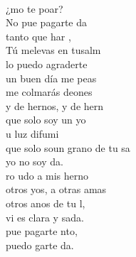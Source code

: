 \documentclass[12pt]{article}
\begin{document}
\begin{multicols*}{2}
\begin{cancion}%
	    \\
	¿mo te poar?  \\
	No pue pagarte da   \\
	 tanto que har , \\
	Tú melevas en tusalm  \\
\jump
	lo puedo agraderte\\
	un buen día me peas\\
	me colmarás deones\\
	y de hernos, y de hern  \\
\jump
	 que solo soy un yo  \\
	u luz difumi\\
	 que solo soun grano de tu sa \\
	yo no soy da.\\
	ro udo a mis herno\\
	otros yos, a otras amas\\
	otros anos de tu l,\\
	 vi es clara y sada. \\
	 pue pagarte nto,\\
	 puedo garte da.\\
\end{cancion}%


\end{multicols*}
\end{document}
